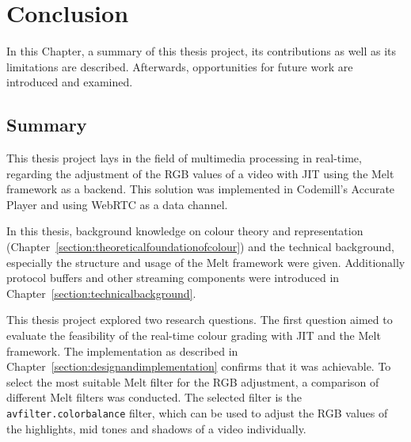 \documentclass[../MasterThesis.tex]{subfiles}
\begin{document}
	
	
%
%
%
%
%
%
%
%
\newpage
\section{Conclusion} \label{section:conclusion}

In this Chapter, a summary of this thesis project, its contributions as well as its limitations are described. Afterwards, opportunities for future work are introduced and examined.






\subsection{Summary} \label{subsection:summary}


This thesis project lays in the field of multimedia processing in real-time, regarding the adjustment of the RGB values of a video with JIT using the Melt framework as a backend. This solution was implemented in Codemill's Accurate Player and using WebRTC as a data channel.

In this thesis, background knowledge on colour theory and representation (Chapter~\ref{section:theoreticalfoundationofcolour}) and the technical background, especially the structure and usage of the Melt framework were given. Additionally protocol buffers and other streaming components were introduced in Chapter~\ref{section:technicalbackground}.

This thesis project explored two research questions. The first question aimed to evaluate the feasibility of the real-time colour grading with JIT and the Melt framework. The implementation as described in Chapter~\ref{section:designandimplementation} confirms that it was achievable. To select the most suitable Melt filter for the RGB adjustment, a comparison of different Melt filters was conducted. The selected filter is the \texttt{avfilter.colorbalance} filter, which can be used to adjust the RGB values of the highlights, mid tones and shadows of a video individually.
\end{document}
